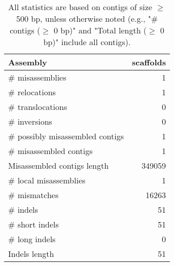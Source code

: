 \documentclass[12pt,a4paper]{article}
\begin{document}
\begin{table}[ht]
\begin{center}
\caption{All statistics are based on contigs of size $\geq$ 500 bp, unless otherwise noted (e.g., "\# contigs ($\geq$ 0 bp)" and "Total length ($\geq$ 0 bp)" include all contigs).}
\begin{tabular}{|l*{1}{|r}|}
\hline
Assembly & scaffolds \\ \hline
\# misassemblies & 1 \\ \hline
\hspace{5mm}\# relocations & 1 \\ \hline
\hspace{5mm}\# translocations & 0 \\ \hline
\hspace{5mm}\# inversions & 0 \\ \hline
\# possibly misassembled contigs & 1 \\ \hline
\# misassembled contigs & 1 \\ \hline
Misassembled contigs length & 349059 \\ \hline
\# local misassemblies & 1 \\ \hline
\# mismatches & 16263 \\ \hline
\# indels & 51 \\ \hline
\hspace{5mm}\# short indels & 51 \\ \hline
\hspace{5mm}\# long indels & 0 \\ \hline
Indels length & 51 \\ \hline
\end{tabular}
\end{center}
\end{table}
\end{document}
